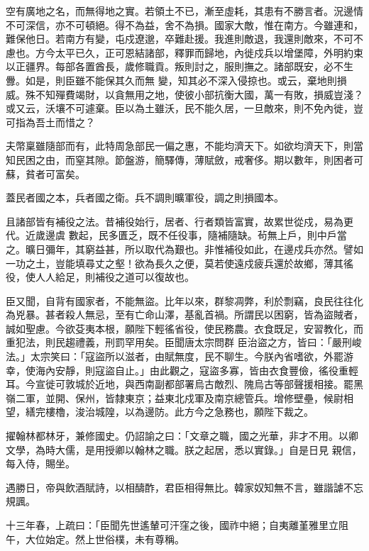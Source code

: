 \begin{pinyinscope}
 空有廣地之名，而無得地之實。若領土不已，漸至虛耗，其患有不勝言者。況邊情不可深信，亦不可頓絕。得不為益，舍不為損。國家大敵，惟在南方。今雖連和，難保他日。若南方有變，屯戍遼邈，卒難赴援。我進則敵退，我還則敵來，不可不慮也。方今太平已久，正可恩結諸部，釋罪而歸地，內徙戍兵以增堡障，外明約束以正疆界。每部各置酋長，歲修職貢。叛則討之，服則撫之。諸部既安，必不生釁。如是，則臣雖不能保其久而無
 變，知其必不深入侵掠也。或云，棄地則損威。殊不知殫費竭財，以貪無用之地，使彼小部抗衡大國，萬一有敗，損威豈淺？或又云，沃壤不可遽棄。臣以為土雖沃，民不能久居，一旦敵來，則不免內徙，豈可指為吾土而惜之？



 夫幣稟雖隨部而有，此特周急部民一偏之惠，不能均濟天下。如欲均濟天下，則當知民困之由，而窒其隙。節盤游，簡驛傳，薄賦斂，戒奢侈。期以數年，則困者可蘇，貧者可富矣。



 蓋民者國之本，兵者國之衛。兵不調則曠軍役，調之則損國本。



 且諸部皆有補役之法。昔補役始行，居者、行者類皆富實，故累世從戍，易為更代。近歲邊虞
 數起，民多匱乏，既不任役事，隨補隨缺。茍無上戶，則中戶當之。曠日彌年，其窮益甚，所以取代為艱也。非惟補役如此，在邊戍兵亦然。譬如一功之土，豈能填尋丈之壑！欲為長久之便，莫若使遠戍疲兵還於故鄉，薄其徭役，使人人給足，則補役之道可以復故也。



 臣又聞，自背有國家者，不能無盜。比年以來，群黎凋弊，利於剽竊，良民往往化為兇暴。甚者殺人無忌，至有亡命山澤，基亂首禍。所謂民以困窮，皆為盜賊者，誠如聖慮。今欲芟夷本根，願陛下輕徭省役，使民務農。衣食既足，安習教化，而重犯法，則民趨禮義，刑罰罕用矣。臣聞唐太宗問群
 臣治盜之方，皆曰：「嚴刑峻法。」太宗笑曰：「寇盜所以滋者，由賦無度，民不聊生。今朕內省嗜欲，外罷游幸，使海內安靜，則寇盜自止。」由此觀之，寇盜多寡，皆由衣食豐儉，徭役重輕耳。今宣徙可敦城於近地，與西南副都部署烏古敵烈、隗烏古等部聲援相接。罷黑嶺二軍，並開、保州，皆隸東京；益東北戍軍及南京總管兵。增修壁壘，候尉相望，繕完樓櫓，浚治城隍，以為邊防。此方今之急務也，願陛下裁之。



 擢翰林都林牙，兼修國史。仍詔諭之曰：「文章之職，國之光華，非才不用。以卿文學，為時大儒，是用授卿以翰林之職。朕之起居，悉以實錄。」自是日見
 親信，每入侍，賜坐。



 遇勝日，帝與飲酒賦詩，以相醻酢，君臣相得無比。韓家奴知無不言，雖諧謔不忘規諷。



 十三年春，上疏曰：「臣聞先世遙輦可汗窪之後，國祚中絕；自夷離堇雅里立阻午，大位始定。然上世俗樸，未有尊稱。




\end{pinyinscope}
